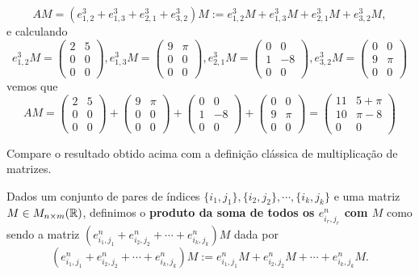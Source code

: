 \[AM=(e^3_{1,2}+e^3_{1,3}+e^3_{2,1}+e^3_{3,2})M:=e^3_{1,2}M+e^3_{1,3}M+e^3_{2,1}M+e^3_{3,2}M,\]e calculando
\[e^3_{1,2}M=\begin{pmatrix}
2 & 5\\
0 & 0\\
0 & 0
\end{pmatrix},e^3_{1,3}M=\begin{pmatrix}
9 & \pi\\
0 & 0\\
0 & 0
\end{pmatrix},e^3_{2,1}M=\begin{pmatrix}
0 & 0\\
1 & -8\\
0 & 0
\end{pmatrix},e^3_{3,2}M=\begin{pmatrix}
0 & 0\\
9 & \pi\\
0 & 0
\end{pmatrix}\]vemos que
\[AM=\begin{pmatrix}
2 & 5\\
0 & 0\\
0 & 0
\end{pmatrix}+\begin{pmatrix}
9 & \pi\\
0 & 0\\
0 & 0
\end{pmatrix}+\begin{pmatrix}
0 & 0\\
1 & -8\\
0 & 0
\end{pmatrix}+\begin{pmatrix}
0 & 0\\
9 & \pi\\
0 & 0
\end{pmatrix}=\begin{pmatrix}
11 & 5+\pi\\
10 & \pi-8\\
0 & 0
\end{pmatrix}\]

\begin{exerc}
	Compare o resultado obtido acima com a definição clássica de multiplicação de matrizes.
\end{exerc}

\begin{df}
	Dados um conjunto de pares de índices $\{i_1,j_1\},\{i_2,j_2\},\cdots,\{i_k,j_k\}$ e uma matriz $M\in M_{n\times m}(\mathbb R)$, definimos o \textbf{produto da soma de todos os $e^n_{i_r,j_r}$ com $M$} como sendo a matriz $(e^n_{i_1,j_1}+e^n_{i_2,j_2}+\cdots+e^n_{i_k,j_k})M$ dada por
	\[(e^n_{i_1,j_1}+e^n_{i_2,j_2}+\cdots+e^n_{i_k,j_k})M:=e^n_{i_1,j_1}M+e^n_{i_2,j_2}M+\cdots+e^n_{i_k,j_k}M.\]
\end{df}

